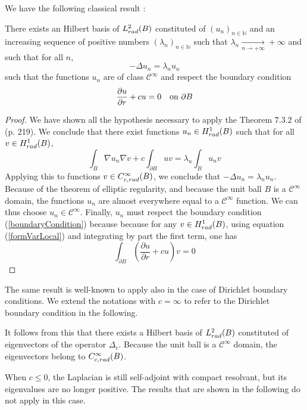 \documentclass[11pt,a4paper]{article}
\begin{document}
We have the following classical result :  
\begin{The} There exists an Hilbert basis of $L^2_{rad}(B)$ constituted of $(u_n)_{n\in \mathbb{N}}$ and an increasing sequence of positive numbers $(\lambda_n)_{n\in \mathbb{N}}$  such that $\lambda_n \underset{n \to +\infty}{\longrightarrow} +\infty$ and such that for all $n$, \[- \Delta u_n = \lambda_n u_n\] such that the functions $u_n$ are of class $\mathcal{C}^{\infty}$ and respect the boundary condition 
\begin{equation}
\dfrac{\partial u}{\partial r} + c u = 0 \quad \textup{on } \partial B
\label{boundaryCondition}
\end{equation}
\begin{proof}
We have shown all the hypothesis necessary to apply the Theorem $7.3.2$ of \cite{allaire2005analyse} (p. 219). We conclude that there exist functions $u_n \in H^1_{rad}(B)$ such that for all $v \in H^1_{rad}(B)$, 
\begin{equation}
\int_{B} \nabla u_n  \nabla v + c\int_{\partial B} uv = \lambda_n \int_{B} u_n v
\label{formVarLocal}
\end{equation}
Applying this to functions $v\in C^\infty_{c,rad}(B)$, we conclude that $-\Delta u_n = \lambda_n u_n$. Because of the theorem of elliptic regularity, and because the unit ball $B$ is a $\mathcal{C}^\infty$ domain, the functions $u_n$ are almost everywhere equal to a $\mathcal{C}^\infty$ function. We can thus choose $u_n \in \mathcal{C}^\infty$. Finally, $u_n$ must respect the boundary condition (\ref{boundaryCondition}) because because for any $v \in H^1_{rad}(B)$, using equation (\ref{formVarLocal}) and integrating by part the first term, one has \[ \int_{\partial B}\left(\dfrac{\partial u}{\partial r} + cu\right) v = 0\]
\end{proof}
\end{The}


\begin{Rem} The same result is well-known to apply also in the case of Dirichlet boundary conditions. We extend the notations with $c = \infty$ to refer to the Dirichlet boundary condition in the following.
\end{Rem}


It follows from this that there exists a Hilbert basis of $L^2_{rad}(B)$ constituted of eigenvectors of the operator $\Delta_c$. Because the unit ball is a $\mathcal{C}^\infty$ domain, the eigenvectors belong to $C^\infty_{c,rad}(B)$.  


\begin{Rem} When $c \leq 0$, the Laplacian is still self-adjoint with compact resolvant, but its eigenvalues are no longer positive. The results that are shown in the following do not apply in this case. 
\end{Rem}
\end{document}
